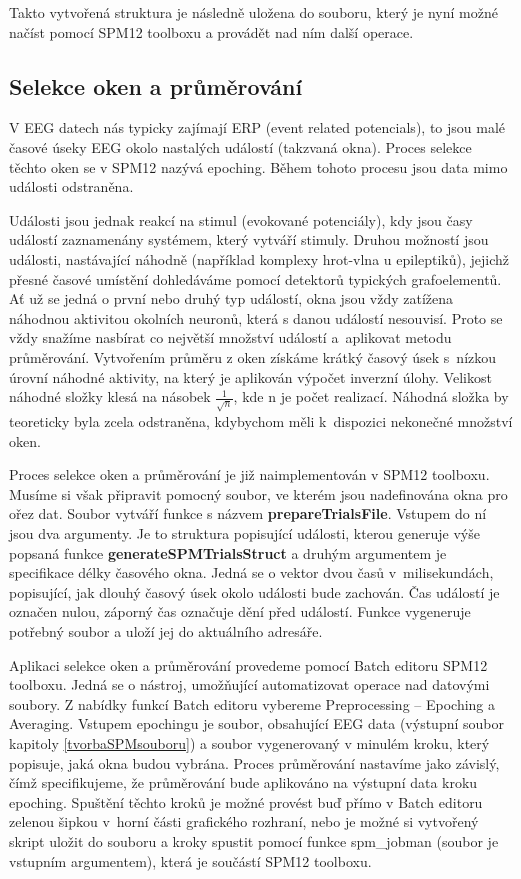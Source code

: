 Takto vytvořená struktura je následně uložena do souboru, který je nyní možné načíst pomocí SPM12 toolboxu a provádět nad ním další operace.

\subsection{Selekce oken a průměrování}
V EEG datech nás typicky zajímají ERP (event related potencials), to jsou malé časové úseky EEG okolo nastalých událostí (takzvaná okna). Proces selekce těchto oken se v SPM12 nazývá epoching. Během tohoto procesu jsou data mimo události odstraněna.

Události jsou jednak reakcí na stimul (evokované potenciály), kdy jsou časy událostí zaznamenány systémem, který vytváří stimuly. Druhou možností jsou události, nastávající náhodně (například komplexy hrot-vlna u epileptiků), jejichž přesné časové umístění dohledáváme pomocí detektorů typických grafoelementů. Ať už se jedná o první nebo druhý typ událostí, okna jsou vždy zatížena náhodnou aktivitou okolních neuronů, která s danou událostí nesouvisí. Proto se vždy snažíme nasbírat co největší množství událostí a~aplikovat metodu průměrování. Vytvořením průměru z oken získáme krátký časový úsek s~nízkou úrovní náhodné aktivity, na který je aplikován výpočet inverzní úlohy. 
Velikost náhodné složky klesá na násobek $\frac{1}{\sqrt{n}}$, kde n je počet realizací.
Náhodná složka by teoreticky byla zcela odstraněna, kdybychom měli k~dispozici nekonečné množství oken.
 
Proces selekce oken a průměrování je již naimplementován v SPM12 toolboxu. Musíme si však připravit pomocný soubor, ve kterém jsou nadefinována okna pro ořez dat. Soubor vytváří funkce s názvem \textbf{prepareTrialsFile}. Vstupem do ní jsou dva argumenty. Je to struktura popisující události, kterou generuje výše popsaná funkce \textbf{generateSPMTrialsStruct} a druhým argumentem je specifikace délky časového okna. Jedná se o vektor dvou časů v~milisekundách, popisující, jak dlouhý časový úsek okolo události bude zachován. Čas událostí je označen nulou, záporný čas označuje dění před událostí. Funkce vygeneruje potřebný soubor a uloží jej do aktuálního adresáře.

Aplikaci selekce oken a průměrování provedeme pomocí Batch editoru SPM12 toolboxu. Jedná se o nástroj, umožňující automatizovat operace nad datovými soubory. Z nabídky funkcí Batch editoru vybereme Preprocessing – Epoching a Averaging. Vstupem epochingu je soubor, obsahující EEG data (výstupní soubor kapitoly \ref{tvorbaSPMsouboru}) a soubor vygenerovaný v minulém kroku, který popisuje, jaká okna budou vybrána. Proces průměrování nastavíme jako závislý, čímž specifikujeme, že průměrování bude aplikováno na výstupní data kroku epoching. Spuštění těchto kroků je možné provést buď přímo v Batch editoru zelenou šipkou v~horní části grafického rozhraní, nebo je možné si vytvořený skript uložit do souboru a kroky spustit pomocí funkce spm\_jobman (soubor je vstupním argumentem), která je součástí SPM12 toolboxu.

